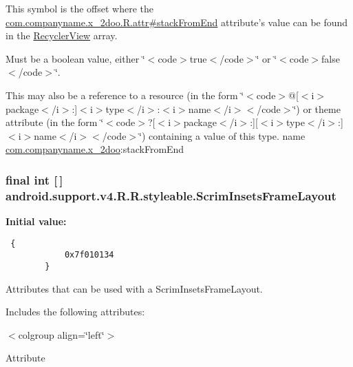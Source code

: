 This symbol is the offset where the \hyperlink{classcom_1_1companyname_1_1x__2doo_1_1_r_1_1attr_aaf52bf7d1580a42f26349c3299f95eb}{com.companyname.x\_\-2doo.R.attr\#stackFromEnd} attribute's value can be found in the \hyperlink{classandroid_1_1support_1_1v4_1_1_r_1_1styleable_2cdeae02a2aae8e03f8765ed3a43caf5}{RecyclerView} array.

Must be a boolean value, either \char`\"{}$<$code$>$true$<$/code$>$\char`\"{} or \char`\"{}$<$code$>$false$<$/code$>$\char`\"{}. 

This may also be a reference to a resource (in the form \char`\"{}$<$code$>$@\mbox{[}$<$i$>$package$<$/i$>$:\mbox{]}$<$i$>$type$<$/i$>$:$<$i$>$name$<$/i$>$$<$/code$>$\char`\"{}) or theme attribute (in the form \char`\"{}$<$code$>$?\mbox{[}$<$i$>$package$<$/i$>$:\mbox{]}\mbox{[}$<$i$>$type$<$/i$>$:\mbox{]}$<$i$>$name$<$/i$>$$<$/code$>$\char`\"{}) containing a value of this type.  name \hyperlink{namespacecom_1_1companyname_1_1x__2doo}{com.companyname.x\_\-2doo}:stackFromEnd \hypertarget{classandroid_1_1support_1_1v4_1_1_r_1_1styleable_e0e3b150de2aa8edce58bfe61daca7de}{
\subsubsection[{ScrimInsetsFrameLayout}]{\setlength{\rightskip}{0pt plus 5cm}final int \mbox{[}$\,$\mbox{]} android.support.v4.R.R.styleable.ScrimInsetsFrameLayout}}
\label{classandroid_1_1support_1_1v4_1_1_r_1_1styleable_e0e3b150de2aa8edce58bfe61daca7de}


\textbf{Initial value:}

\begin{Code}\begin{verbatim} {
            0x7f010134
        }
\end{verbatim}
\end{Code}
Attributes that can be used with a ScrimInsetsFrameLayout. 

Includes the following attributes: \begin{TabularC}{0}
\hline
\end{TabularC}
$<$colgroup align=\char`\"{}left\char`\"{}$>$ 

Attribute

